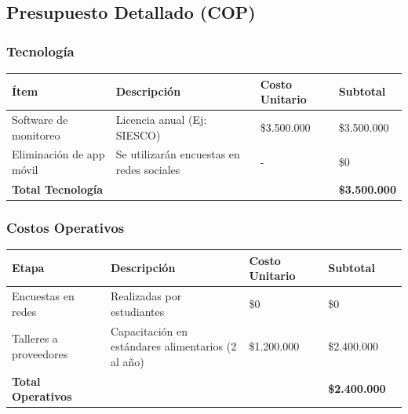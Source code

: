\documentclass[letterpaper, 11pt]{report}
\begin{document}
\subsection{Presupuesto Detallado (COP)}

\subsubsection{Tecnología}

\begin{longtable}{|p{.25\linewidth}|p{.25\linewidth}|p{.25\linewidth}|p{.25\linewidth}|}
      \hline
      \textbf{Ítem}             & \textbf{Descripción}                      & \textbf{Costo Unitario} & \textbf{Subtotal}    \\
      \hline
      Software de monitoreo     & Licencia anual (Ej: SIESCO)               & \$3.500.000             & \$3.500.000          \\
      \hline
      Eliminación de app móvil  & Se utilizarán encuestas en redes sociales & -                       & \$0                  \\
      \hline
      \textbf{Total Tecnología} &                                           &                         & \textbf{\$3.500.000} \\
      \hline
\end{longtable}

\subsubsection{Costos Operativos}

\begin{longtable}{|p{0.25\linewidth}|p{0.35\linewidth}|p{0.20\linewidth}|p{0.20\linewidth}|}
      \hline
      \textbf{Etapa}            & \textbf{Descripción}                               & \textbf{Costo Unitario} & \textbf{Subtotal}    \\
      \hline
      Encuestas en redes        & Realizadas por estudiantes                         & \$0                     & \$0                  \\
      \hline
      Talleres a proveedores    & Capacitación en estándares alimentarios (2 al año) & \$1.200.000             & \$2.400.000          \\
      \hline
      \textbf{Total Operativos} &                                                    &                         & \textbf{\$2.400.000} \\
      \hline
\end{longtable}
\end{document}
